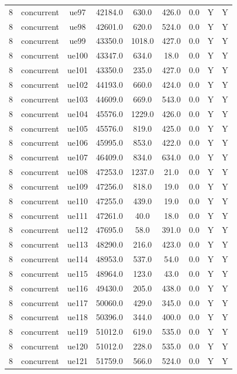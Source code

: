 \begin{table}[ht]
\begin{tabular}{|c|c|c|c|c|c|c|c|c|}
8 & concurrent & ue97 & 42184.0 & 630.0 & 426.0 & 0.0 & Y & Y \\
8 & concurrent & ue98 & 42601.0 & 620.0 & 524.0 & 0.0 & Y & Y \\
8 & concurrent & ue99 & 43350.0 & 1018.0 & 427.0 & 0.0 & Y & Y \\
8 & concurrent & ue100 & 43347.0 & 634.0 & 18.0 & 0.0 & Y & Y \\
8 & concurrent & ue101 & 43350.0 & 235.0 & 427.0 & 0.0 & Y & Y \\
8 & concurrent & ue102 & 44193.0 & 660.0 & 424.0 & 0.0 & Y & Y \\
8 & concurrent & ue103 & 44609.0 & 669.0 & 543.0 & 0.0 & Y & Y \\
8 & concurrent & ue104 & 45576.0 & 1229.0 & 426.0 & 0.0 & Y & Y \\
8 & concurrent & ue105 & 45576.0 & 819.0 & 425.0 & 0.0 & Y & Y \\
8 & concurrent & ue106 & 45995.0 & 853.0 & 422.0 & 0.0 & Y & Y \\
8 & concurrent & ue107 & 46409.0 & 834.0 & 634.0 & 0.0 & Y & Y \\
8 & concurrent & ue108 & 47253.0 & 1237.0 & 21.0 & 0.0 & Y & Y \\
8 & concurrent & ue109 & 47256.0 & 818.0 & 19.0 & 0.0 & Y & Y \\
8 & concurrent & ue110 & 47255.0 & 439.0 & 19.0 & 0.0 & Y & Y \\
8 & concurrent & ue111 & 47261.0 & 40.0 & 18.0 & 0.0 & Y & Y \\
8 & concurrent & ue112 & 47695.0 & 58.0 & 391.0 & 0.0 & Y & Y \\
8 & concurrent & ue113 & 48290.0 & 216.0 & 423.0 & 0.0 & Y & Y \\
8 & concurrent & ue114 & 48953.0 & 537.0 & 54.0 & 0.0 & Y & Y \\
8 & concurrent & ue115 & 48964.0 & 123.0 & 43.0 & 0.0 & Y & Y \\
8 & concurrent & ue116 & 49430.0 & 205.0 & 438.0 & 0.0 & Y & Y \\
8 & concurrent & ue117 & 50060.0 & 429.0 & 345.0 & 0.0 & Y & Y \\
8 & concurrent & ue118 & 50396.0 & 344.0 & 400.0 & 0.0 & Y & Y \\
8 & concurrent & ue119 & 51012.0 & 619.0 & 535.0 & 0.0 & Y & Y \\
8 & concurrent & ue120 & 51012.0 & 228.0 & 535.0 & 0.0 & Y & Y \\
8 & concurrent & ue121 & 51759.0 & 566.0 & 524.0 & 0.0 & Y & Y \\

\end{tabular}
\end{table}
